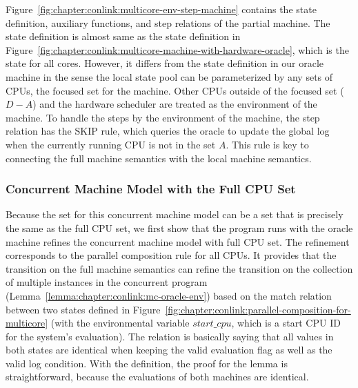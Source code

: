 Figure~\ref{fig:chapter:conlink:multicore-env-step-machine} contains the state definition, 
auxiliary functions, and step relations of the partial machine. 
The state definition is almost same as the state definition in Figure~\ref{fig:chapter:conlink:multicore-machine-with-hardware-oracle},
which is the state for all cores.
However, it differs from the state definition in our oracle machine in the sense the local state pool can be parameterized by any sets of CPUs, the focused set for the machine.
Other CPUs outside of the focused set ($D - A$) and the hardware scheduler are treated as the environment of the machine. 
To handle the steps by the environment of the machine, the step relation has the \textsf{SKIP} rule, 
which queries the oracle to update the global log when the currently running CPU is not in the set $A$.
This rule is  key to connecting the full machine semantics with the local machine semantics. 

\subsubsection{Concurrent Machine Model with the Full CPU Set}

Because the set for this concurrent machine model can be a set that is precisely the same as the full CPU set, 
we first show that the program runs with the oracle machine refines the concurrent machine model with full CPU set. 
The refinement corresponds to the parallel composition rule for all CPUs. It provides that the transition on the full machine semantics can refine the transition on the collection of multiple instances in the concurrent program (Lemma~\ref{lemma:chapter:conlink:mc-oracle-env}) based on the 
match relation between two states defined in Figure~\ref{fig:chapter:conlink:parallel-composition-for-multicore} (with the 
environmental variable $start\_cpu$, which is a start CPU ID for the system's evaluation).
The relation is basically saying that all values in both states are identical when keeping the valid evaluation flag as well as the valid log condition. 
With the definition, the proof for the lemma is straightforward, because the  evaluations of both machines are identical. 

